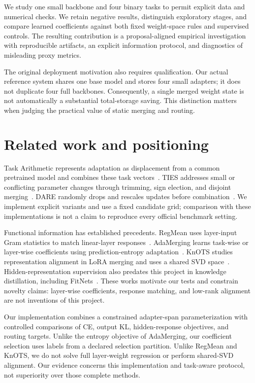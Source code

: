 \documentclass[11pt,a4paper]{article}
\begin{document}
We study one small backbone and four binary tasks to permit explicit data and numerical checks. We retain negative results, distinguish exploratory stages, and compare learned coefficients against both fixed weight-space rules and supervised controls. The resulting contribution is a proposal-aligned empirical investigation with reproducible artifacts, an explicit information protocol, and diagnostics of misleading proxy metrics.

The original deployment motivation also requires qualification. Our actual reference system shares one base model and stores four small adapters; it does not duplicate four full backbones. Consequently, a single merged weight state is not automatically a substantial total-storage saving. This distinction matters when judging the practical value of static merging and routing.

\section{Related work and positioning}
Task Arithmetic represents adaptation as displacement from a common pretrained model and combines these task vectors~\cite{ta}. TIES addresses small or conflicting parameter changes through trimming, sign election, and disjoint merging~\cite{ties}. DARE randomly drops and rescales updates before combination~\cite{dare}. We implement explicit variants and use a fixed candidate grid; comparison with these implementations is not a claim to reproduce every official benchmark setting.

Functional information has established precedents. RegMean uses layer-input Gram statistics to match linear-layer responses~\cite{regmean}. AdaMerging learns task-wise or layer-wise coefficients using prediction-entropy adaptation~\cite{adamerge}. KnOTS studies representation alignment in LoRA merging and uses a shared SVD space~\cite{knots}. Hidden-representation supervision also predates this project in knowledge distillation, including FitNets~\cite{fitnets}. These works motivate our tests and constrain novelty claims: layer-wise coefficients, response matching, and low-rank alignment are not inventions of this project.

Our implementation combines a constrained adapter-span parameterization with controlled comparisons of CE, output KL, hidden-response objectives, and routing targets. Unlike the entropy objective of AdaMerging, our coefficient selection uses labels from a declared selection partition. Unlike RegMean and KnOTS, we do not solve full layer-weight regression or perform shared-SVD alignment. Our evidence concerns this implementation and task-aware protocol, not superiority over those complete methods.
\end{document}
